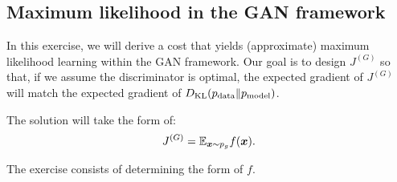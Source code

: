 \subsection{Maximum likelihood in the GAN framework}
\label{sec:mle_exercise}

In this exercise, we will derive a cost that yields (approximate) maximum likelihood learning within the GAN framework.
Our goal is to design $J^{(G)}$ so that, if we assume the discriminator is optimal, the expected gradient of $J^{(G)}$
will match the expected gradient of $D_{\mathrm{KL}}(p_{\rm{data}} \Vert p_{\rm{model}})$.

The solution will take the form of:
\[
  J^{(G)} = \mathbb{E}_{{\bm{x}} \sim p_g} f({\bm{x}}) .
\]

The exercise consists of determining the form of $f$.


